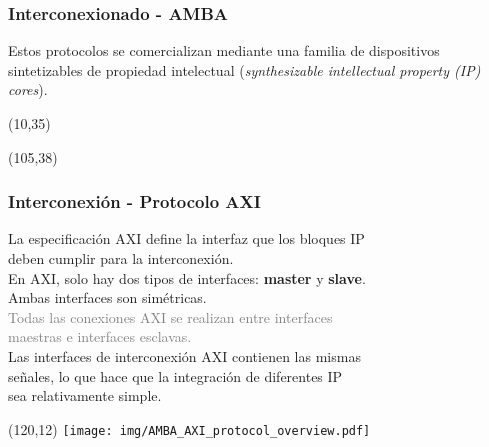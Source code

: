 \documentclass[aspectratio=169]{beamer}
\begin{document}
\begin{frame}[t,fragile]
    \frametitle{Interconexionado - AMBA}
    Estos protocolos se comercializan mediante una familia de dispositivos sintetizables de propiedad intelectual (\emph{synthesizable intellectual property (IP) cores}).\\
    \vspace{0.2cm}
    \begin{textblock}{10}(10,35)  \end{textblock}
    \begin{textblock}{40}(105,38) \small
     \bigskip
     \bigskip
    \end{textblock}
\end{frame}

\begin{frame}[t,fragile]
    \frametitle{Interconexión - Protocolo AXI}  
    La especificación AXI define la interfaz que los bloques IP\\
    deben cumplir para la interconexión.\\
    \pause
    \bigskip
    En AXI, solo hay dos tipos de interfaces: \textbf{master} y \textbf{slave}.\\
    \textcolor{verdeuca}{Ambas interfaces son simétricas.}\\
    \pause
    \bigskip
    \textcolor{gray}{Todas las conexiones AXI se realizan entre interfaces\\
    maestras e interfaces esclavas.}\\
    \pause
    \bigskip
    Las interfaces de interconexión AXI contienen las mismas\\
    señales, lo que hace que la integración de diferentes IP\\
    sea relativamente simple.
    \begin{textblock}{10}(120,12) \texttt{[image: img/AMBA\_AXI\_protocol\_overview.pdf]} \end{textblock}
\end{frame}
\end{document}
